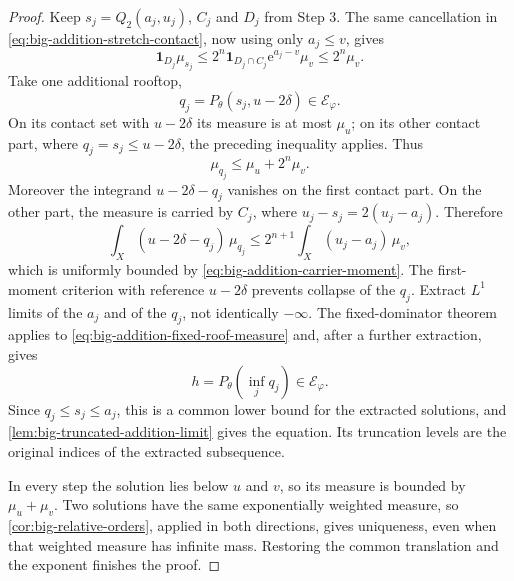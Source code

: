 \begin{proof}
Keep $s_j=Q_2(a_j,u_j)$, $C_j$ and $D_j$ from Step 3. The same cancellation in \eqref{eq:big-addition-stretch-contact}, now using only $a_j\leq v$, gives
\[
 \mathbf1_{D_j}\mu_{s_j}
 \leq2^n\mathbf1_{D_j\cap C_j}\mathrm{e}^{a_j-v}\mu_v
 \leq2^n\mu_v.
\]
Take one additional rooftop,
\[
 q_j=P_\theta(s_j,u-2\delta)\in\mathcal E_\varphi.
\]
On its contact set with $u-2\delta$ its measure is at most $\mu_u$; on its other contact part, where $q_j=s_j\leq u-2\delta$, the preceding inequality applies. Thus
\begin{equation}\label{eq:big-addition-fixed-roof-measure}
 \mu_{q_j}\leq\mu_u+2^n\mu_v.
\end{equation}
Moreover the integrand $u-2\delta-q_j$ vanishes on the first contact part. On the other part, the measure is carried by $C_j$, where $u_j-s_j=2(u_j-a_j)$. Therefore
\[
 \int_X(u-2\delta-q_j)\,\mu_{q_j}
 \leq2^{n+1}\int_X(u_j-a_j)\,\mu_v,
\]
which is uniformly bounded by \eqref{eq:big-addition-carrier-moment}. The first-moment criterion with reference $u-2\delta$ prevents collapse of the $q_j$. Extract $L^1$ limits of the $a_j$ and of the $q_j$, not identically $-\infty$. The fixed-dominator theorem applies to \eqref{eq:big-addition-fixed-roof-measure} and, after a further extraction, gives
\[
 h=P_\theta\left(\inf_jq_j\right)\in\mathcal E_\varphi.
\]
Since $q_j\leq s_j\leq a_j$, this is a common lower bound for the extracted solutions, and \cref{lem:big-truncated-addition-limit} gives the equation. Its truncation levels are the original indices of the extracted subsequence.

In every step the solution lies below $u$ and $v$, so its measure is bounded by $\mu_u+\mu_v$. Two solutions have the same exponentially weighted measure, so \cref{cor:big-relative-orders}, applied in both directions, gives uniqueness, even when that weighted measure has infinite mass. Restoring the common translation and the exponent finishes the proof.
\end{proof}
